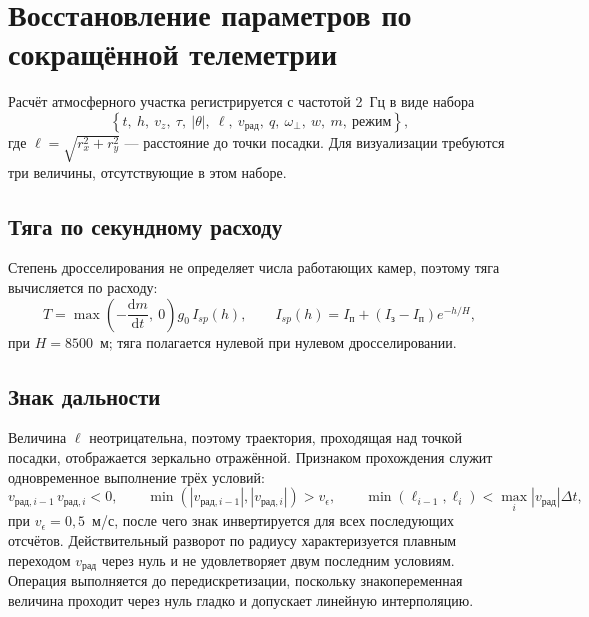 \documentclass[11pt,a4paper]{article}
\newcommand{\dd}{\mathrm{d}}
\begin{document}
\section{Восстановление параметров по сокращённой телеметрии}

Расчёт атмосферного участка регистрируется с частотой 2~Гц в виде набора
\begin{equation}
\left\{t,\ h,\ v_z,\ \tau,\ \lvert\theta\rvert,\
 \ell,\ v_{\text{рад}},\ q,\ \omega_\perp,\ w,\ m,\ \text{режим}\right\},
\end{equation}
где $\ell=\sqrt{r_x^2+r_y^2}$ — расстояние до точки посадки. Для визуализации
требуются три величины, отсутствующие в этом наборе.

\subsection{Тяга по секундному расходу}

Степень дросселирования не определяет числа работающих камер, поэтому тяга
вычисляется по расходу:
\begin{equation}
T = \max\!\left(-\frac{\dd m}{\dd t},\ 0\right) g_0\, I_{sp}(h),
\qquad
I_{sp}(h) = I_{\text{п}}
 + \left(I_{\text{з}}-I_{\text{п}}\right) e^{-h/H},
\end{equation}
при $H=8500$~м; тяга полагается нулевой при нулевом дросселировании.

\subsection{Знак дальности}

Величина $\ell$ неотрицательна, поэтому траектория, проходящая над точкой
посадки, отображается зеркально отражённой. Признаком прохождения служит
одновременное выполнение трёх условий:
\begin{equation}
v_{\text{рад},i-1}\,v_{\text{рад},i} < 0,
\qquad
\min\left(\left\lvert v_{\text{рад},i-1}\right\rvert,
 \left\lvert v_{\text{рад},i}\right\rvert\right) > v_\epsilon,
\qquad
\min\left(\ell_{i-1},\ell_i\right)
 < \max_i\left\lvert v_{\text{рад}}\right\rvert\Delta t ,
\end{equation}
при $v_\epsilon=0{,}5$~м/с, после чего знак инвертируется для всех последующих
отсчётов. Действительный разворот по радиусу характеризуется плавным переходом
$v_{\text{рад}}$ через нуль и не удовлетворяет двум последним условиям. Операция
выполняется до передискретизации, поскольку знакопеременная величина проходит
через нуль гладко и допускает линейную интерполяцию.
\end{document}
